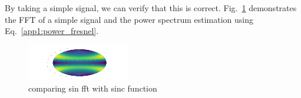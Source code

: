 By taking a simple signal, we can verify that this is correct. Fig.~\ref{app1:sinderivative:fresnel} demonstrates the \gls{FFT} of a simple signal and the power spectrum estimation using Eq.~\ref{app1:power_fresnel}.

\begin{figure}
	\centering
	\includegraphics[width=\linewidth]{testimg.png}
	\caption{comparing sin fft with sinc function}
	\label{app1:sinderivative:fresnel}
\end{figure}

